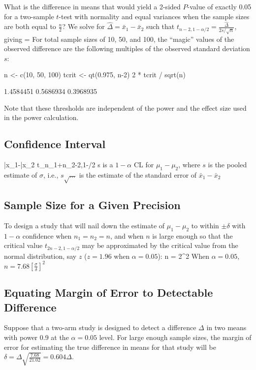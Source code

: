 What is the difference in means that would yield a 2-sided $P$-value
of exactly 0.05 for a two-sample $t$-test with normality and equal
variances when the sample sizes are both equal to $\frac{n}{2}$?  We
solve for $\hat{\Delta} = \bar{x}_{1} - \bar{x}_{2}$ such 
that $t_{n-2,1-\alpha/2} = \frac{\hat{\Delta}}{2s/\sqrt{n}}$, giving
\beq
\hat{\Delta} = 
\eeq
For total sample sizes of 10, 50, and 100, the ``magic'' values of the
observed difference are the following multiples of the observed
standard deviation $s$:
\begin{Schunk}
\begin{Sinput}
n <- c(10, 50, 100)
tcrit <- qt(0.975, n-2)
2 * tcrit / sqrt(n)
\end{Sinput}
\begin{Soutput}
[1] 1.4584451 0.5686934 0.3968935
\end{Soutput}
\end{Schunk}
Note that these thresholds are independent of the power and the effect
size used in the power calculation.

\subsection{Confidence Interval}  
\beq
\bar{x}_{1}-\bar{x}_{2} \pm t_{n_{1}+n_{2}-2,1-\alpha/2} \times s \times
{}
\eeq
is a $1-\alpha$ CL for $\mu_{1}-\mu_{2}$, where $s$ is the pooled
estimate of $\sigma$, i.e., $s \sqrt{\ldots}$ is the estimate of the
standard error of $\bar{x}_{1}-\bar{x}_{2}$

\subsection{Sample Size for a Given Precision}
To design a study that will nail down the estimate of $\mu_{1}-\mu_{2}$
to within $\pm \delta$ with $1-\alpha$ confidence when $n_{1}=n_{2}=n$, and
when $n$ is large enough so that the critical value
$t_{2n-2,1-\alpha/2}$ may be approximated by the critical value from
the normal distribution, say $z$ ($z=1.96$ when $\alpha=0.05$):
\beq
n = 2^{2}
\eeq
When $\alpha=0.05$, $n = 7.68 [\frac{\sigma}{\delta}]^{2}$

\subsection{Equating Margin of Error to Detectable Difference}
Suppose that a two-arm study is designed to detect a difference $\Delta$ in two
means with power 0.9 at the $\alpha=0.05$ level.  For large enough
sample sizes, the margin of error for estimating the true difference
in means for that study will be $\delta =
\Delta\sqrt{\frac{7.68}{21.02}} = 0.604\Delta$.

